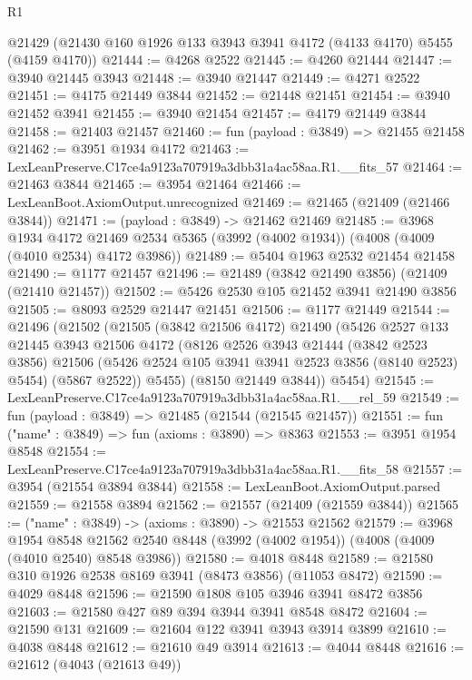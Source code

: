 \begin{lexlean}{R1}
\begin{coremodule}
  @21429 (@21430 @160 @1926 @133 @3943 @3941 @4172 (@4133 @4170) @5455 (@4159 @4170))
@21444 := @4268 @2522
@21445 := @4260 @21444
@21447 := @3940 @21445 @3943
@21448 := @3940 @21447
@21449 := @4271 @2522
@21451 := @4175 @21449 @3844
@21452 := @21448 @21451
@21454 := @3940 @21452 @3941
@21455 := @3940 @21454
@21457 := @4179 @21449 @3844
@21458 := @21403 @21457
@21460 := fun (payload : @3849) => @21455 @21458
@21462 := @3951 @1934 @4172
@21463 := LexLeanPreserve.C17ce4a9123a707919a3dbb31a4ac58aa.R1.__fits_57
@21464 := @21463 @3844
@21465 := @3954 @21464
@21466 := LexLeanBoot.AxiomOutput.unrecognized
@21469 := @21465 (@21409 (@21466 @3844))
@21471 := (payload : @3849) -> @21462 @21469
@21485 := @3968
    @1934
    @4172
    @21469
    @2534
    @5365
    (@3992 (@4002 @1934))
    (@4008 (@4009 (@4010 @2534) @4172 @3986))
@21489 := @5404 @1963 @2532 @21454 @21458
@21490 := @1177 @21457
@21496 := @21489 (@3842 @21490 @3856) (@21409 (@21410 @21457))
@21502 := @5426 @2530 @105 @21452 @3941 @21490 @3856
@21505 := @8093 @2529 @21447 @21451
@21506 := @1177 @21449
@21544 := @21496
    (@21502
      (@21505
        (@3842 @21506 @4172)
        @21490
        (@5426
          @2527
          @133
          @21445
          @3943
          @21506
          @4172
          (@8126
            @2526
            @3943
            @21444
            (@3842 @2523 @3856)
            @21506
            (@5426 @2524 @105 @3941 @3941 @2523 @3856 (@8140 @2523) @5454)
            (@5867 @2522))
          @5455)
        (@8150 @21449 @3844))
      @5454)
@21545 := LexLeanPreserve.C17ce4a9123a707919a3dbb31a4ac58aa.R1.__rel_59
@21549 := fun (payload : @3849) => @21485 (@21544 (@21545 @21457))
@21551 := fun ("name" : @3849) => fun (axioms : @3890) => @8363
@21553 := @3951 @1954 @8548
@21554 := LexLeanPreserve.C17ce4a9123a707919a3dbb31a4ac58aa.R1.__fits_58
@21557 := @3954 (@21554 @3894 @3844)
@21558 := LexLeanBoot.AxiomOutput.parsed
@21559 := @21558 @3894
@21562 := @21557 (@21409 (@21559 @3844))
@21565 := ("name" : @3849) -> (axioms : @3890) -> @21553 @21562
@21579 := @3968
    @1954
    @8548
    @21562
    @2540
    @8448
    (@3992 (@4002 @1954))
    (@4008 (@4009 (@4010 @2540) @8548 @3986))
@21580 := @4018 @8448
@21589 := @21580 @310 @1926 @2538 @8169 @3941 (@8473 @3856) (@11053 @8472)
@21590 := @4029 @8448
@21596 := @21590 @1808 @105 @3946 @3941 @8472 @3856
@21603 := @21580 @427 @89 @394 @3944 @3941 @8548 @8472
@21604 := @21590 @131
@21609 := @21604 @122 @3941 @3943 @3914 @3899
@21610 := @4038 @8448
@21612 := @21610 @49 @3914
@21613 := @4044 @8448
@21616 := @21612 (@4043 (@21613 @49))

\end{coremodule}
\end{lexlean}
